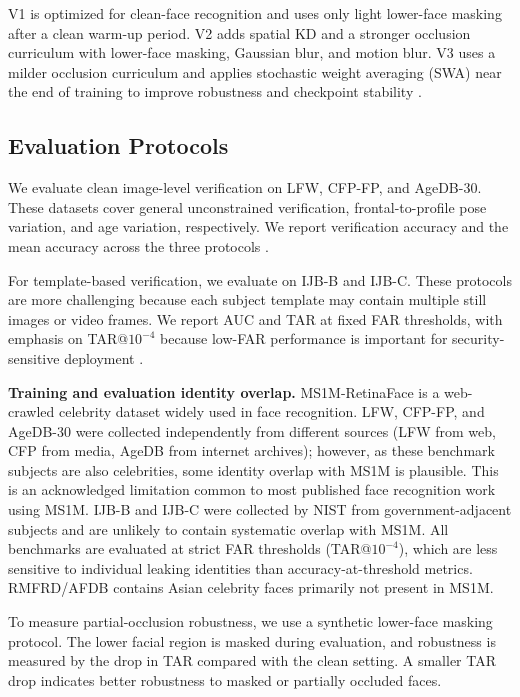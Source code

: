 V1 is optimized for clean-face recognition and uses only light lower-face masking after a clean warm-up period. V2 adds spatial KD and a stronger occlusion curriculum with lower-face masking, Gaussian blur, and motion blur. V3 uses a milder occlusion curriculum and applies stochastic weight averaging (SWA) near the end of training to improve robustness and checkpoint stability \cite{izmailov2019averagingweightsleadswider}.

\subsection{Evaluation Protocols}

We evaluate clean image-level verification on LFW, CFP-FP, and AgeDB-30. These datasets cover general unconstrained verification, frontal-to-profile pose variation, and age variation, respectively. We report verification accuracy and the mean accuracy across the three protocols \cite{lfw,cfp,agedb}.

For template-based verification, we evaluate on IJB-B and IJB-C. These protocols are more challenging because each subject template may contain multiple still images or video frames. We report AUC and TAR at fixed FAR thresholds, with emphasis on TAR@$10^{-4}$ because low-FAR performance is important for security-sensitive deployment \cite{ijbb,ijbc}.

\textbf{Training and evaluation identity overlap.} MS1M-RetinaFace is a web-crawled celebrity dataset widely used in face recognition. LFW, CFP-FP, and AgeDB-30 were collected independently from different sources (LFW from web, CFP from media, AgeDB from internet archives); however, as these benchmark subjects are also celebrities, some identity overlap with MS1M is plausible. This is an acknowledged limitation common to most published face recognition work using MS1M. IJB-B and IJB-C were collected by NIST from government-adjacent subjects and are unlikely to contain systematic overlap with MS1M. All benchmarks are evaluated at strict FAR thresholds (TAR@$10^{-4}$), which are less sensitive to individual leaking identities than accuracy-at-threshold metrics. RMFRD/AFDB contains Asian celebrity faces primarily not present in MS1M.

To measure partial-occlusion robustness, we use a synthetic lower-face masking protocol. The lower facial region is masked during evaluation, and robustness is measured by the drop in TAR compared with the clean setting. A smaller TAR drop indicates better robustness to masked or partially occluded faces.

